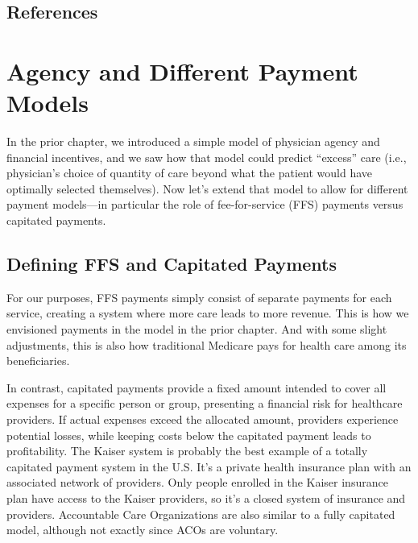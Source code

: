 \documentclass[
  letterpaper,
  DIV=11,
  numbers=noendperiod]{scrreport}
\theoremstyle{definition}
\theoremstyle{remark}
\begin{document}
\hypertarget{references-1}{%
\section*{References}\label{references-1}}


\hypertarget{agency-and-different-payment-models}{%
\chapter{Agency and Different Payment
Models}\label{agency-and-different-payment-models}}

In the prior chapter, we introduced a simple model of physician agency
and financial incentives, and we saw how that model could predict
``excess'' care (i.e., physician's choice of quantity of care beyond
what the patient would have optimally selected themselves). Now let's
extend that model to allow for different payment models---in particular
the role of fee-for-service (FFS) payments versus capitated payments.

\hypertarget{defining-ffs-and-capitated-payments}{%
\section{Defining FFS and Capitated
Payments}\label{defining-ffs-and-capitated-payments}}

For our purposes, FFS payments simply consist of separate payments for
each service, creating a system where more care leads to more revenue.
This is how we envisioned payments in the model in the prior chapter.
And with some slight adjustments, this is also how traditional Medicare
pays for health care among its beneficiaries.

In contrast, capitated payments provide a fixed amount intended to cover
all expenses for a specific person or group, presenting a financial risk
for healthcare providers. If actual expenses exceed the allocated
amount, providers experience potential losses, while keeping costs below
the capitated payment leads to profitability. The Kaiser system is
probably the best example of a totally capitated payment system in the
U.S. It's a private health insurance plan with an associated network of
providers. Only people enrolled in the Kaiser insurance plan have access
to the Kaiser providers, so it's a closed system of insurance and
providers. Accountable Care Organizations are also similar to a fully
capitated model, although not exactly since ACOs are voluntary.
\end{document}
